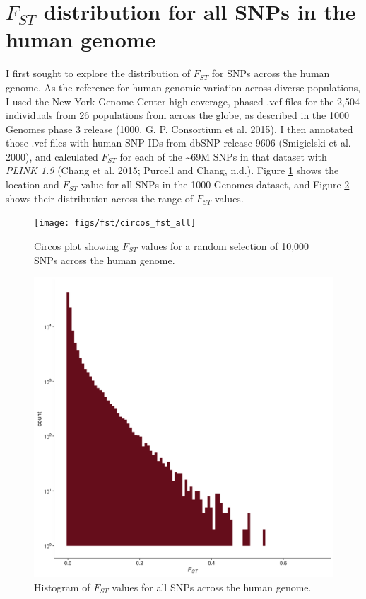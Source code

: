 \documentclass[
]{book}
\begin{document}
\hypertarget{f_st-distribution-for-all-snps-in-the-human-genome}{%
\section{\texorpdfstring{\(F_{ST}\) distribution for all SNPs in the human genome}{F\_\{ST\} distribution for all SNPs in the human genome}}\label{f_st-distribution-for-all-snps-in-the-human-genome}}

I first sought to explore the distribution of \(F_{ST}\) for SNPs across the human genome. As the reference for human genomic variation across diverse populations, I used the New York Genome Center high-coverage, phased .vcf files for the 2,504 individuals from 26 populations from across the globe, as described in the 1000 Genomes phase 3 release (1000. G. P. Consortium et al. 2015). I then annotated those .vcf files with human SNP IDs from dbSNP release 9606 (Smigielski et al. 2000), and calculated \(F_{ST}\) for each of the \textasciitilde69M SNPs in that dataset with \emph{PLINK 1.9} (Chang et al. 2015; Purcell and Chang, n.d.). Figure \ref{fig:fst-circos} shows the location and \(F_{ST}\) value for all SNPs in the 1000 Genomes dataset, and Figure \ref{fig:fst-histo} shows their distribution across the range of \(F_{ST}\) values.



\begin{figure}
\texttt{[image: figs/fst/circos\_fst\_all]} \caption{Circos plot showing \(F_{ST}\) values for a random selection of 10,000 SNPs across the human genome.}\label{fig:fst-circos}
\end{figure}



\begin{figure}

{\centering \includegraphics[width=0.8\linewidth]{figs/fst/histo_fst_all} 

}

\caption{Histogram of \(F_{ST}\) values for all SNPs across the human genome.}\label{fig:fst-histo}
\end{figure}
\end{document}
